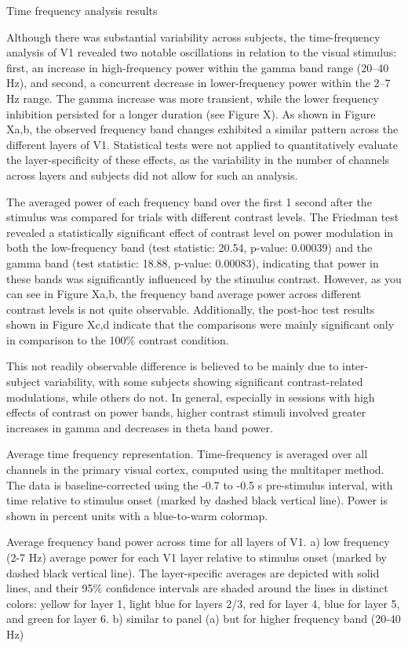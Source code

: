 \documentclass[
  letterpaper,
  DIV=11,
  numbers=noendperiod]{scrartcl}
\begin{document}
Time frequency analysis results

Although there was substantial variability across subjects, the
time-frequency analysis of V1 revealed two notable oscillations in
relation to the visual stimulus: first, an increase in high-frequency
power within the gamma band range (20--40 Hz), and second, a concurrent
decrease in lower-frequency power within the 2--7 Hz range. The gamma
increase was more transient, while the lower frequency inhibition
persisted for a longer duration (see Figure X). As shown in Figure Xa,b,
the observed frequency band changes exhibited a similar pattern across
the different layers of V1. Statistical tests were not applied to
quantitatively evaluate the layer-specificity of these effects, as the
variability in the number of channels across layers and subjects did not
allow for such an analysis.

The averaged power of each frequency band over the first 1 second after
the stimulus was compared for trials with different contrast levels. The
Friedman test revealed a statistically significant effect of contrast
level on power modulation in both the low-frequency band (test
statistic: 20.54, p-value: 0.00039) and the gamma band (test statistic:
18.88, p-value: 0.00083), indicating that power in these bands was
significantly influenced by the stimulus contrast. However, as you can
see in Figure Xa,b, the frequency band average power across different
contrast levels is not quite observable. Additionally, the post-hoc test
results shown in Figure Xc,d indicate that the comparisons were mainly
significant only in comparison to the 100\% contrast condition.

This not readily observable difference is believed to be mainly due to
inter-subject variability, with some subjects showing significant
contrast-related modulations, while others do not. In general,
especially in sessions with high effects of contrast on power bands,
higher contrast stimuli involved greater increases in gamma and
decreases in theta band power.

Average time frequency representation. Time-frequency is averaged over
all channels in the primary visual cortex, computed using the multitaper
method. The data is baseline-corrected using the -0.7 to -0.5 s
pre-stimulus interval, with time relative to stimulus onset (marked by
dashed black vertical line). Power is shown in percent units with a
blue-to-warm colormap.

Average frequency band power across time for all layers of V1. a) low
frequency (2-7 Hz) average power for each V1 layer relative to stimulus
onset (marked by dashed black vertical line). The layer-specific
averages are depicted with solid lines, and their 95\% confidence
intervals are shaded around the lines in distinct colors: yellow for
layer 1, light blue for layers 2/3, red for layer 4, blue for layer 5,
and green for layer 6. b) similar to panel (a) but for higher frequency
band (20-40 Hz)
\end{document}
